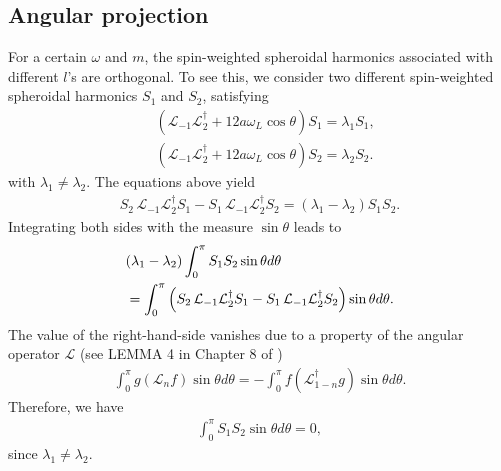 \documentclass[aps,prd,amsmath,floats,floatfix, twocolumn,
superscriptaddress,nofootinbib,showpacs]{revtex4-1}
\begin{document}
\subsection{Angular projection}
\label{subsec:angular_projection}

For a certain $\omega$ and $m$, the spin-weighted spheroidal harmonics associated with different $l$'s are orthogonal. To see this, we consider two different spin-weighted spheroidal harmonics $S_1$ and $S_2$, satisfying 
\begin{subequations}
\begin{align}
    &(\mathcal{L}_{-1}\mathcal{L}_2^\dagger+12a\omega_L \cos\theta )S_1 = \lambda_1  S_1,  \\
    &(\mathcal{L}_{-1}\mathcal{L}_2^\dagger+12a\omega_L \cos\theta )S_2 = \lambda_2  S_2.
\end{align}  
\end{subequations}
with $\lambda_1\neq \lambda_2$.
The equations above yield
\begin{align}
    S_2\, \mathcal{L}_{-1}\mathcal{L}_2^\dagger S_1- S_1\, \mathcal{L}_{-1}\mathcal{L}_2^\dagger S_2 = (\lambda_1-\lambda_2) S_1S_2.
\end{align}
Integrating both sides with the measure $\sin \theta$ leads to
\begin{align}
    &(\lambda_1-\lambda_2) \int_0^\pi  S_1S_2 \sin\theta d\theta \notag \\
    &= \int_0^\pi \left(S_2\, \mathcal{L}_{-1}\mathcal{L}_2^\dagger S_1- S_1\, \mathcal{L}_{-1}\mathcal{L}_2^\dagger S_2\right) \sin\theta d\theta.
\end{align}
The value of the right-hand-side vanishes due to a property of the angular operator $\mathcal{L}$ (see LEMMA 4 in Chapter 8 of \cite{chandrasekhar1998mathematical})
\begin{align}
    \int_0^\pi g(\mathcal{L}_nf)\sin\theta d\theta  = - \int_0^\pi f(\mathcal{L}_{1-n}^\dagger g) \sin\theta d\theta.
\end{align}
Therefore, we have 
\begin{align}
     \int_0^\pi  S_1S_2 \sin\theta d\theta = 0,
\end{align}
since $\lambda_1\neq \lambda_2$.
\end{document}
